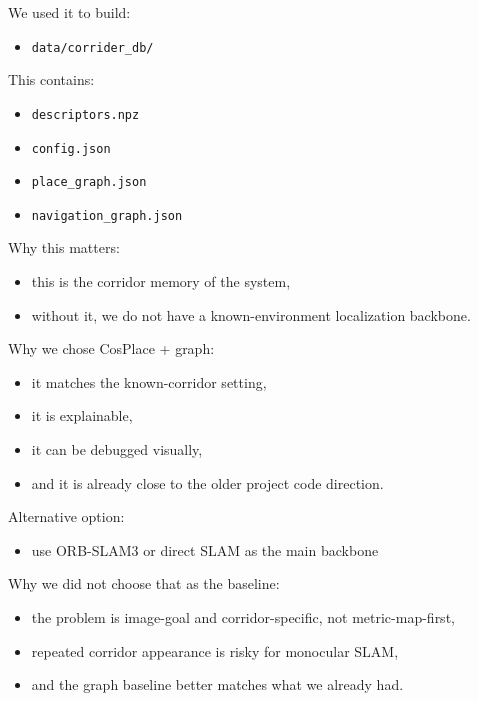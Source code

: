 \documentclass[11pt,a4paper]{article}
\begin{document}
We used it to build:

\begin{itemize}[nosep]
  \item \texttt{data/corrider\_db/}
\end{itemize}

This contains:

\begin{itemize}[nosep]
  \item \texttt{descriptors.npz}
  \item \texttt{config.json}
  \item \texttt{place\_graph.json}
  \item \texttt{navigation\_graph.json}
\end{itemize}

Why this matters:

\begin{itemize}[nosep]
  \item this is the corridor memory of the system,
  \item without it, we do not have a known-environment localization backbone.
\end{itemize}

Why we chose CosPlace + graph:

\begin{itemize}[nosep]
  \item it matches the known-corridor setting,
  \item it is explainable,
  \item it can be debugged visually,
  \item and it is already close to the older project code direction.
\end{itemize}

Alternative option:

\begin{itemize}[nosep]
  \item use ORB-SLAM3 or direct SLAM as the main backbone
\end{itemize}

Why we did not choose that as the baseline:

\begin{itemize}[nosep]
  \item the problem is image-goal and corridor-specific, not metric-map-first,
  \item repeated corridor appearance is risky for monocular SLAM,
  \item and the graph baseline better matches what we already had.
\end{itemize}
\end{document}
